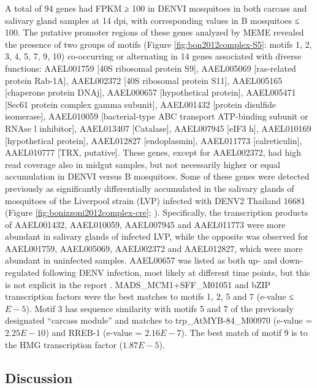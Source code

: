 A total of 94 genes had FPKM ≥ 100 in \gls{DENVI} mosquitoes in both carcass and salivary gland samples at 14 \gls{dpi}, with corresponding values in B mosquitoes ≤ 100.
The putative promoter regions of these genes analyzed by MEME revealed the presence of two groups of motifs (Figure \ref{fig:bon2012complex-S5}: motifs 1, 2, 3, 4, 5, 7, 9, 10) co-occurring or alternating in 14 genes associated with diverse functions: AAEL001759 [40S ribosomal protein S9], AAEL005069 [ras-related protein Rab-1A], AAEL002372 [40S ribosomal protein S11], AAEL005165 [chaperone protein DNAj], AAEL000657 [hypothetical protein], AAEL005471 [Sec61 protein complex gamma subunit], AAEL001432 [protein disulfide isomerase], AAEL010059 [bacterial-type ABC transport ATP-binding subunit or RNAse l inhibitor], AAEL013407 [Catalase], AAEL007945 [eIF3 h], AAEL010169 [hypothetical protein], AAEL012827 [endoplasmin], AAEL011773 [calreticulin], AAEL010777 [TRX, putative].
These genes, except for AAEL002372, had high read coverage also in midgut samples, but not necessarily higher or equal accumulation in \gls{DENVI} versus B mosquitoes.
Some of these genes were detected previously as significantly differentially accumulated in the salivary glands of mosquitoes of the Liverpool strain (LVP) infected with \gls{DENV}2 Thailand 16681 (Figure \ref{fig:bonizzoni2012complex-cre}; \cite{Luplertlop2011}).
Specifically, the transcription products of AAEL001432, AAEL010059, AAEL007945 and AAEL011773 were more abundant in salivary glands of infected LVP, while the opposite was observed for AAEL001759, AAEL005069, AAEL002372 and AAEL012827, which were more abundant in uninfected samples.
AAEL00657 was listed as both up- and down-regulated following \gls{DENV} infection, most likely at different time points, but this is not explicit in the report \cite{Luplertlop2011}.
MADS\_MCM1+SFF\_M01051 and bZIP transcription factors were the best matches to motifs 1, 2, 5 and 7 (e-value ≤ $E-5$).
Motif 3 has sequence similarity with motifs 5 and 7 of the previously designated “carcass module” and matches to trp\_AtMYB-84\_M00970 (e-value = $2.25E-10$) and RREB-1 (e-value = $2.16E-7$).
The best match of motif 9 is to the HMG transcription factor ($1.87E-5$).


\subsection{Discussion}

